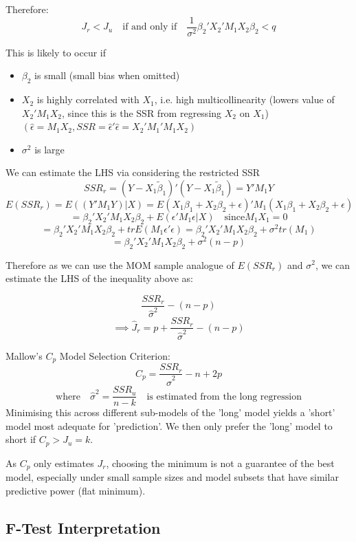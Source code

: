 \documentclass[DIV=14,titlepage=false]{scrreprt}
\begin{document}
\vspace{5mm}
\begin{solution}
Therefore: \[J_r<J_u \quad \text{if and only if} \quad \frac{1}{\sigma^2}\beta_2'X_2'M_1X_2\beta_2<q\]
\end{solution}
This is likely to occur if
\begin{itemize}
    \item \(\beta_2\) is small (small bias when omitted)
    \item \(X_2\) is highly correlated with \(X_1\), i.e. high multicollinearity (lowers value of \(X_2'M_1X_2\), since this is the SSR from regressing \(X_2\) on \(X_1\)) \((\hat{\epsilon}=M_1X_2, SSR=\hat{\epsilon}'\hat{\epsilon}=X_2'M_1'M_1X_2)\)
    \item \(\sigma^2\) is large
\end{itemize}

We can estimate the LHS via considering the restricted SSR
\[SSR_r=(Y-X_1\tilde{\beta}_1)'(Y-X_1\tilde{\beta}_1)=Y'M_1Y\]
\[E(SSR_r)=E((Y'M_1Y)|X)=E(X_1\beta_1+X_2\beta_2+\epsilon)'M_1(X_1\beta_1+X_2\beta_2+\epsilon)\]
\[=\beta_2'X_2'M_1X_2\beta_2+E(\epsilon'M_1\epsilon|X) \quad \text{since} M_1X_1=0\]
\[=\beta_2'X_2'M_1X_2\beta_2+trE(M_1\epsilon'\epsilon)=\beta_2'X_2'M_1X_2\beta_2+\sigma^2tr(M_1)\]
\[=\beta_2'X_2'M_1X_2\beta_2+\sigma^2(n-p)\]

Therefore as we can use the MOM sample analogue of \(E(SSR_r)\) and \(\sigma^2\), we can estimate the LHS of the inequality above as:

\[\frac{SSR_r}{\hat{\sigma}^2}-(n-p)\]
\[\implies \hat{J}_r=p+\frac{SSR_r}{\hat{\sigma}^2}-(n-p)\]

\begin{definition} Mallow's \(C_p\) Model Selection Criterion:
    \[C_p=\frac{SSR_r}{\hat{\sigma}^2} -n + 2p\]
    \[\text{where} \quad \hat{\sigma}^2=\frac{SSR_u}{n-k} \quad \text{is estimated from the long regression}\]
Minimising this across different sub-models of the 'long' model yields a 'short' model most adequate for 'prediction'.
We then only prefer the 'long' model to short if \(C_p>J_u=k\).
\end{definition}

As \(C_p\) only estimates \(J_r\), choosing the minimum is not a guarantee of the best model, especially under small sample sizes and model subsets that have similar predictive power (flat minimum).

\subsection{F-Test Interpretation}
\end{document}

